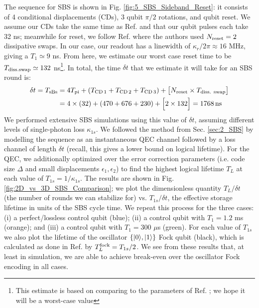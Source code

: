 \noindent The sequence for SBS is shown in Fig. \ref{fig:5_SBS_Sideband_Reset}: it consists of 4 conditional displacements (CDs), 3 qubit $\pi/2$ rotations, and qubit reset. We assume our CDs take the same time as Ref. \cite{sivak2023gkp-expt} and that our qubit pulses each take 32 ns; meanwhile for reset, we follow Ref. \cite{nordquantique2023gkp-expt} where the authors used $N_{\rm reset} = 2$ dissipative swaps. In our case, our readout has a linewidth of $\kappa_r / 2\pi \approx 16$ MHz, giving a $T_1 \simeq 9$ ns. From here, we estimate our worst case reset time to be $T_{\rm diss. swap} \simeq 132$ ns\footnote{This estimate is based on comparing to the parameters of Ref. \cite{nordquantique2023gkp-expt}; we hope it will be a worst-case value}. In total, the time $\delta t$ that we estimate it will take for an SBS round is:
\begin{align*}
\delta t = T_{\rm sBs}  &= 4T_{\rm pi} + (T_{\rm CD\,1} + T_{\rm CD\,2} + T_{\rm CD\,3}) + \big[N_{\text{reset}}\times T_{\text{diss. swap}}\big] \\ &= 4\times (32) + (470 + 676 + 230) + \Big[2 \times 132\Big] = 1768\, {\rm ns}
\end{align*}
We performed extensive SBS simulations using this value of $\delta t$, assuming different levels of single-photon loss $\kappa_{1s}$. We followed the method from Sec. \ref{sec:2_SBS} by modelling the sequence as an instantaneous QEC channel followed by a loss channel of length $\delta t$ (recall, this gives a lower bound on logical lifetime). For the QEC, we additionally optimized over the error correction parameters (i.e. code size $\Delta$ and small displacements $\epsilon_1, \epsilon_2$) to find the highest logical lifetime $T_L$ at each value of $T_{1s} = 1/\kappa_{1s}$. The results are shown in Fig. \ref{fig:2D_vs_3D_SBS_Comparison}; we plot the dimensionless quantity $T_L/\delta t$ (the number of rounds we can stabilize for) vs. $T_{1s}/\delta t$, the effective storage lifetime in units of the SBS cycle time. We repeat this process for the three cases: (i) a perfect/lossless control qubit (blue); (ii) a control qubit with $T_1 = 1.2$ ms (orange); and (iii) a control qubit with $T_1 = 300$ $\mu$s (green). For each value of $T_{1s}$ we also plot the lifetime of the oscillator $\{\lvert0\rangle, \lvert1\rangle\}$ Fock qubit (black), which is calculated as done in Ref. \cite{royer2020gkp} by $T_L^{\rm fock} = T_{1s}/2$. We see from these results that, at least in simulation, we are able to achieve break-even over the oscillator Fock encoding in all cases. 

